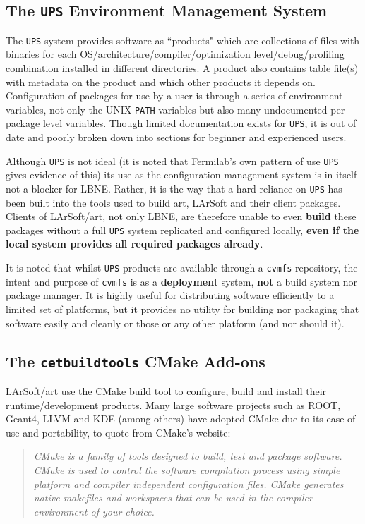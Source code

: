 \documentclass[usletter]{article}
\newcommand{\code}[1]{\texttt{#1}}
\newcommand{\ups}{\code{UPS}\xspace}
\newcommand{\cetbuildtools}{\code{cetbuildtools}\xspace}
\newcommand{\art}{art\xspace}
\newcommand{\larsoft}{LArSoft\xspace}
\begin{document}
\subsection{The \ups Environment Management System}

The \ups system provides software as ``products" which are
 collections of files with binaries for each
OS/architecture/compiler/optimization level/debug/profiling combination installed
in different directories. A product also contains table file(s)
with metadata on the product and which other products it depends on.
Configuration of packages for use by a user is through a series of
environment variables, not only the UNIX \code{PATH} variables but also many
undocumented per-package level variables. Though limited documentation
exists for \ups, it is out of date and poorly broken down into sections
for beginner and experienced users.

Although \ups is not ideal (it is noted that Fermilab's own pattern of use
\ups gives evidence of this) its use as the configuration management system
is in itself not a blocker for LBNE. Rather, it is the way that a hard
reliance on \ups has been built into the tools used to build \art,
\larsoft and their client packages. Clients of \larsoft/\art, not only
LBNE, are therefore unable to even \textbf{build} these packages without a full
\ups system replicated and configured locally, \textbf{even if the local system
provides all required packages already}.

It is noted that whilst \ups products are available through a \code{cvmfs}
repository, the intent and purpose of \code{cvmfs} is as a \textbf{deployment} system,
\textbf{not} a build system nor package manager. It is highly
useful for distributing software efficiently to a limited set of platforms,
but it provides no utility for building nor packaging that software easily
and cleanly or those or any other platform (and nor should it).

\subsection{The \cetbuildtools CMake Add-ons}

\larsoft/\art use the CMake build tool to configure, build and install
their runtime/development products. Many large software projects such as
ROOT, Geant4, LLVM and KDE (among others) have adopted CMake due to its
ease of use and portability, to quote from CMake's website:

\begin{quote}
\textit{CMake is a family of tools designed to build, test and package software.
 CMake is used to control the software compilation process using simple
 platform and compiler independent configuration files. CMake generates
 native makefiles and workspaces that can be used in the compiler
 environment of your choice.}
\end{quote}
\end{document}
